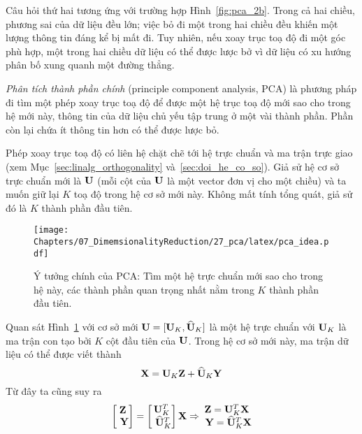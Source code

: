 Câu hỏi thứ hai tương ứng với trường hợp Hình~\ref{fig:pca_2b}. Trong cả hai
chiều, phương sai của dữ liệu đều lớn; việc bỏ đi một trong hai chiều đều khiến
một lượng thông tin đáng kể bị mất đi. Tuy nhiên, nếu xoay trục toạ độ đi một
góc phù hợp, một trong hai chiều dữ liệu có thể được lược bở vì dữ liệu có xu
hướng phân bố xung quanh một đường thẳng.

\textit{Phân tích thành phần chính} (principle component analysis, PCA) là
phương pháp đi tìm một phép xoay trục toạ độ để được một hệ trục toạ độ mới sao
cho trong hệ mới này, thông tin của dữ liệu chủ yếu tập trung ở một vài thành
phần. Phần còn lại chứa ít thông tin hơn có thể được lược bỏ.

Phép xoay trục toạ độ có liên hệ chặt chẽ tới hệ trực chuẩn và ma trận trực giao
(xem Mục~\ref{sec:linalg_orthogonality} và~\ref{sec:doi_he_co_so}). Giả sử hệ cơ
sở trực chuẩn mới là $\mathbf{U}$ (mỗi cột của $\mathbf{U}$ là một vector đơn vị cho
một chiều) và ta muốn giữ lại $K$ toạ độ trong hệ
cơ sở mới này. Không mất tính tổng quát, giả sử đó là $K$ thành phần đầu tiên.
\begin{figure}[t]
\centering
\texttt{[image: Chapters/07\_DimemsionalityReduction/27\_pca/latex/pca\_idea.pdf]}
\caption[]{Ý tưởng chính của PCA: Tìm một hệ trực chuẩn mới sao cho trong hệ này, các thành phần quan trọng nhất nằm trong $K$ thành phần đầu tiên.}
\label{fig:27_3}
\end{figure}
Quan sát Hình~\ref{fig:27_3} với cơ sở mới $\mathbf{U} =
[\mathbf{U}_K, \widehat{\mathbf{U}}_K]$ là một hệ trực chuẩn với $\mathbf{U}_K$ là ma trận con tạo bởi $K$ cột đầu tiên của $\mathbf{U}$. Trong hệ cơ sở mới này, ma trận dữ liệu có thể được viết thành
\begin{equation}
\label{eqn:27_8}
\mathbf{X} = \mathbf{U}_K \mathbf{Z} + \widehat{\mathbf{U}}_K \mathbf{Y}
\end{equation}
Từ đây ta cũng suy ra
\begin{eqnarray}
\label{eqn:27_9}
\left[\begin{matrix} \mathbf{Z} \\\ \mathbf{Y} \end{matrix} \right] =
\left[\begin{matrix} \mathbf{U}_K^T \\\ \widehat{\mathbf{U}}_K^T \end{matrix} \right]\mathbf{X} \Rightarrow
\begin{matrix}
\mathbf{Z} = \mathbf{U}_K^T \mathbf{X} \\\
\mathbf{Y} = \widehat{\mathbf{U}}_K^T\mathbf{X}
\end{matrix}
\end{eqnarray}
